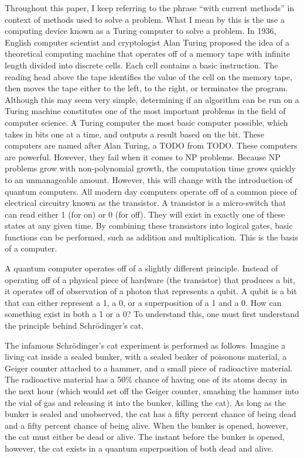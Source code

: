 \documentclass[12pt]{article}
\begin{document}
\begin{flushleft}
Throughout this paper, I keep referring to the phrase ``with current methods'' in context of methods used to solve a problem. What I mean by this is the use a computing device known as a Turing computer to solve a problem. In 1936, English computer scientist and cryptologist Alan Turing proposed the idea of a theoretical computing machine that operates off of a memory tape with infinite length divided into discrete cells. Each cell contains a basic instruction. The reading head above the tape identifies the value of the cell on the memory tape, then moves the tape either to the left, to the right, or terminates the program. Although this may seem very simple, determining if an algorithm can be run on a Turing machine constitutes one of the most important problems in the field of computer science. A Turing computer the most basic computer possible, which takes in bits one at a time, and outputs a result based on the bit. These computers are named after Alan Turing, a TODO from TODO. These computers are powerful. However, they fail when it comes to NP problems. Because NP problems grow with non-polynomial growth, the computation time grows quickly to an unmanageable amount. However, this will change with the introduction of quantum computers. 
All modern day computers operate off of a common piece of electrical circuitry known as the transistor. A transistor is a micro-switch that can read either 1 (for on) or 0 (for off). They will exist in exactly one of these states at any given time. By combining these transistors into logical gates, basic functions can be performed, such as addition and multiplication. This is the basis of a computer. 

A quantum computer operates off of a slightly different principle. Instead of operating off of a physical piece of hardware (the transistor) that produces a bit, it operates off of observation of a photon that represents a qubit. A qubit is a bit that can either represent a 1, a 0, or a superposition of a 1 and a 0. How can something exist in both a 1 or a 0? To understand this, one must first understand the principle behind Schr\"{o}dinger’s cat. 


The infamous Schr\"{o}dinger's cat experiment is performed as follows. Imagine a living cat inside a sealed bunker, with a sealed beaker of poisonous material, a Geiger counter attached to a hammer, and a small piece of radioactive material. The radioactive material has a 50\% chance of having one of its atoms decay in the next hour (which would set off the Geiger counter, smashing the hammer into the vial of gas and releasing it into the bunker, killing the cat). As long as the bunker is sealed and unobserved, the cat has a fifty percent chance of being dead and a fifty percent chance of being alive. When the bunker is opened, however, the cat must either be dead or alive. The instant before the bunker is opened, however, the cat exists in a quantum superposition of both dead and alive. 


\end{flushleft}
\end{document}
